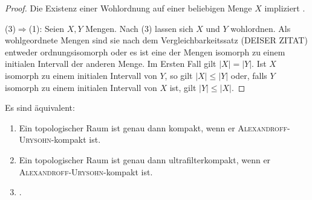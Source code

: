 \begin{proof}
  Die Existenz einer Wohlordnung auf einer beliebigen Menge $X$ impliziert \AC.

  (3)$\Rightarrow$(1):
  Seien $X,Y$ Mengen. Nach (3) lassen sich $X$ und $Y$ wohlordnen.
  Als wohlgeordnete Mengen sind sie nach dem Vergleichbarkeitssatz (DEISER ZITAT) entweder ordnungsisomorph oder es ist eine der Mengen isomorph zu einem initialen Intervall der anderen Menge.
  Im Ersten Fall gilt $|X| = |Y|$.
  Ist $X$ isomorph zu einem initialen Intervall von $Y$, so gilt $|X| \leq |Y|$ oder, falls $Y$ isomorph zu einem initialen Intervall von $X$ ist, gilt $|Y| \leq |X|$.
\end{proof}

\begin{thm}
  Es sind äquivalent:
  \begin{enumerate}[(1)]
    \item Ein topologischer Raum ist genau dann kompakt, wenn er \textsc{Alexandroff}-\textsc{Urysohn}-kompakt ist.
    \item Ein topologischer Raum ist genau dann ultrafilterkompakt, wenn er \textsc{Alexandroff}-\textsc{Urysohn}-kompakt ist.
    \item \AC.
  \end{enumerate}
\end{thm}

